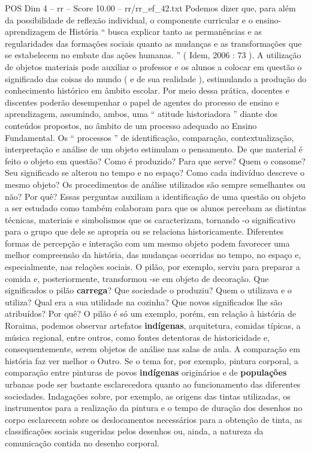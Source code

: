 \begin{textsample}{POS Dim 4 – rr – Score 10.00 – rr/rr\_ef\_42.txt}
Podemos dizer que, para além da possibilidade de reflexão individual, o componente curricular e o ensino-aprendizagem de História “ busca explicar tanto as permanências e as regularidades das formações sociais quanto as mudanças e as transformações que se estabelecem no embate das ações humanas. ” ( Idem, 2006 : 73 ).
A utilização de objetos materiais pode auxiliar o professor e os alunos a colocar em questão o significado das coisas do mundo ( e de sua realidade ), estimulando a produção do conhecimento histórico em âmbito escolar.
Por meio dessa prática, docentes e discentes poderão desempenhar o papel de agentes do processo de ensino e aprendizagem, assumindo, ambos, uma “ atitude historiadora ” diante dos conteúdos propostos, no âmbito de um processo adequado ao Ensino Fundamental.
Os “ processos ” de identificação, comparação, contextualização, interpretação e análise de um objeto estimulam o pensamento.
De que material é feito o objeto em questão?
Como é produzido?
Para que serve?
Quem o consome?
Seu significado se alterou no tempo e no espaço?
Como cada indivíduo descreve o mesmo objeto?
Os procedimentos de análise utilizados são sempre semelhantes ou não?
Por quê?
Essas perguntas auxiliam a identificação de uma questão ou objeto a ser estudado como também colaboram para que os alunos percebam as distintas técnicas, materiais e simbolismos que os caracterizam, tornando -o significativo para o grupo que dele se apropria ou se relaciona historicamente.
Diferentes formas de percepção e interação com um mesmo objeto podem favorecer uma melhor compreensão da história, das mudanças ocorridas no tempo, no espaço e, especialmente, nas relações sociais.
O pilão, por exemplo, serviu para preparar a comida e, posteriormente, transformou -se em objeto de decoração.
Que significados o pilão \textbf{carrega}?
Que sociedade o produziu?
Quem o utilizava e o utiliza?
Qual era a sua utilidade na cozinha?
Que novos significados lhe são atribuídos?
Por quê?
O pilão é só um exemplo, porém, em relação à história de Roraima, podemos observar artefatos \textbf{indígenas}, arquitetura, comidas típicas, a música regional, entre outros, como fontes detentoras de historicidade e, consequentemente, serem objetos de análise nas salas de aula.
A comparação em história faz ver melhor o Outro.
Se o tema for, por exemplo, pintura corporal, a comparação entre pinturas de povos \textbf{indígenas} originários e de \textbf{populações} urbanas pode ser bastante esclarecedora quanto ao funcionamento das diferentes sociedades.
Indagações sobre, por exemplo, as origens das tintas utilizadas, os instrumentos para a realização da pintura e o tempo de duração dos desenhos no corpo esclarecem sobre os deslocamentos necessários para a obtenção de tinta, as classificações sociais sugeridas pelos desenhos ou, ainda, a natureza da comunicação contida no desenho corporal.

\end{textsample}
